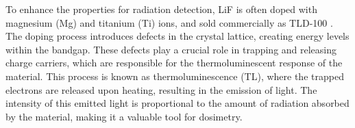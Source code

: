 \vspace{10pt}

To enhance the properties for radiation detection, LiF is often doped with magnesium (Mg) and titanium (Ti) ions, and sold commercially as TLD-100 \cite{lif}. The doping process introduces defects in the crystal lattice, creating energy levels within the bandgap. These defects play a crucial role in trapping and releasing charge carriers, which are responsible for the thermoluminescent response of the material. This process is known as thermoluminescence (TL), where the trapped electrons are released upon heating, resulting in the emission of light. The intensity of this emitted light is proportional to the amount of radiation absorbed by the material, making it a valuable tool for dosimetry.